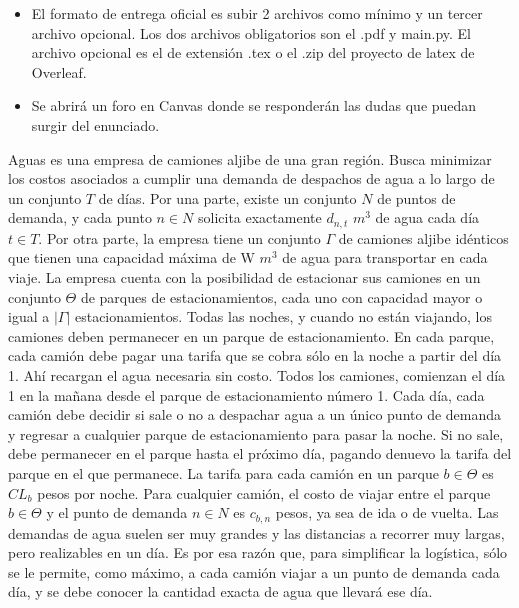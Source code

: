 \documentclass[addpoints,10pt]{exam}
\begin{document}
\begin{itemize}
    \item El formato de entrega oficial es subir 2 archivos como mínimo y un tercer archivo opcional. Los dos archivos obligatorios son el .pdf y main.py. El archivo opcional es el de extensión .tex o el .zip del proyecto de latex de Overleaf.

    \item Se abrirá un foro en Canvas donde se responderán las dudas que puedan surgir del enunciado. 
\end{itemize}


\newpage
\begin{questions}

    
    \question[20]

Aguas es una empresa de camiones aljibe de una gran región. Busca minimizar los costos asociados a cumplir una demanda de despachos de agua a lo largo de un conjunto $T$ de días. Por una parte, existe un conjunto $N$ de puntos de demanda, y cada punto $n \in N$ solicita exactamente $d_{n,t}$ $m^3$ de agua cada día $t\in T$. Por otra parte, la empresa tiene un conjunto  $\Gamma$ de camiones aljibe idénticos que tienen una capacidad máxima de W $m^3$ de agua para transportar en cada viaje. La empresa cuenta con la posibilidad de estacionar sus camiones en un conjunto $\Theta$ de parques de estacionamientos, cada uno con capacidad mayor o igual a $|\Gamma|$ estacionamientos.
Todas las noches, y cuando no están viajando, los camiones deben permanecer en un parque de estacionamiento. En cada parque, cada camión debe pagar una tarifa que se cobra sólo en la noche a partir del día 1. Ahí recargan el agua necesaria sin costo. Todos los camiones, comienzan el día 1 en la mañana desde el parque de estacionamiento número 1. Cada día, cada camión debe decidir si sale o no a despachar agua a un único punto de demanda  y regresar a cualquier parque de estacionamiento para pasar la noche. Si no sale, debe permanecer en el parque hasta el próximo día, pagando denuevo la tarifa del parque en el que permanece. La tarifa para cada camión en un parque $b \in \Theta $ es $CL_b$ pesos por noche. Para cualquier camión, el costo de viajar entre el parque $b \in \Theta $ y el punto de demanda $n \in N$ es $c_{b,n}$ pesos, ya sea de ida o de vuelta. Las demandas de agua suelen ser muy grandes y las distancias a recorrer muy largas, pero realizables en un día. Es por esa razón que, para simplificar la logística, sólo se le permite, como máximo, a cada camión viajar a un punto de demanda cada día, y se debe conocer la cantidad exacta de agua que llevará ese día.


\end{questions}
\end{document}
